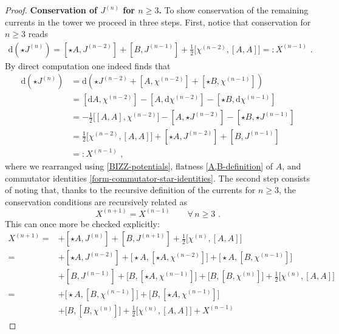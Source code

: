 \documentclass[10pt,a4paper]{amsart}
\begin{document}
\begin{proof}
\textbf{Conservation of $J^{(n)}$ for $n\geq3$.} \qquad To show conservation of the remaining currents in the tower we proceed in three steps. First, notice that conservation for $n\geq3$ reads
\begin{equation}
\begin{aligned}
\mathrm{d}(\star J^{(n)})= [\star A,J^{(n-2)}]+[B,J^{(n-1)}]+\tfrac{1}{2}\bigl[\chi^{(n-2)},[A,A]\bigr] =: X^{(n-1)} \,\, .
\end{aligned}
\end{equation}
By direct computation one indeed finds that
\begin{equation}
\begin{aligned}
\mathrm{d}(\star J^{(n)})&=\mathrm{d}(\star J^{(n-2)}+[A,\chi^{(n-2)}]+[\star B,\chi^{(n-1)}])
\\
&=[\mathrm{d}A,\chi^{(n-2)}]-[A,\mathrm{d}\chi^{(n-2)}]-[\star B,\mathrm{d}\chi^{(n-1)}]
\\
&=-\tfrac{1}{2}\bigl[ [A,A],\chi^{(n-2)}\bigr]-[A,\star J^{(n-2)}]-[\star B,\star J^{(n-1)}]
\\
&=\tfrac{1}{2}\bigl[\chi^{(n-2)},[A,A]\bigr]+[\star A, J^{(n-2)}]+[B, J^{(n-1)}]
\\
&=: X^{(n-1)} \,\, ,
\end{aligned}
\end{equation}
where we rearranged using \eqref{BIZZ-potentials}, flatness \eqref{A,B-definition} of $A$, and commutator identities \eqref{form-commutator-star-identities}. The second step consists of noting that, thanks to the recursive definition of the currents for $n \geq 3$, the conservation conditions are recursively related as
\begin{equation}
X^{(n+1)}=X^{(n-1)} \qquad \forall \, n\geq 3 \,\, .
\end{equation}
This can once more be checked explicitly:
\begin{equation}
\begin{aligned}
X^{(n+1)}=&+[\star A,J^{(n)}]+[B,J^{(n+1)}]+\tfrac{1}{2}\bigl[\chi^{(n)},[A,A]\bigr] 
\\
=&+[\star A,J^{(n-2)}]+\bigl[\star A,[\star A,\chi^{(n-2)}] \bigr]+\bigl[\star A,[B,\chi^{(n-1)}]  \bigr]
\\
&+[B,J^{(n-1)}]+\bigl[B,[\star A,\chi^{(n-1)}] \bigr]+\bigl[B,[B,\chi^{(n)}] \bigr]+\tfrac{1}{2}\bigl[\chi^{(n)},[A,A]\bigr]
\\
=&+\bigl[\star A,[B,\chi^{(n-1)}]  \bigr]+\bigl[B,[\star A,\chi^{(n-1)}] \bigr]
\\
&+\bigl[B,[B,\chi^{(n)}] \bigr]+\tfrac{1}{2}\bigl[\chi^{(n)},[A,A]\bigr]+X^{(n-1)}

\end{aligned}
\end{equation}
\end{proof}
\end{document}
